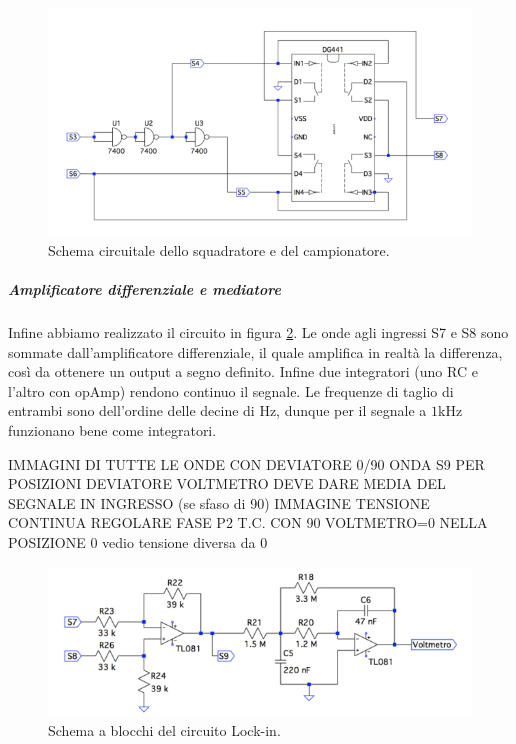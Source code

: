 \documentclass[10pt,a4paper]{article}
\begin{document}
\begin{figure}[!htb]
  \centering
  \includegraphics[scale=0.75]{sqadratore-campionatore.png}
\caption{Schema circuitale dello squadratore e del campionatore.\label{fig:sqadratore-campionatore}}
\end{figure}


\subparagraph{Amplificatore differenziale e mediatore}
Infine abbiamo realizzato il circuito in figura \ref{fig:amplificatorediff-mediatore}. Le onde agli ingressi S7 e S8 sono sommate dall'amplificatore differenziale, il quale amplifica in realtà la differenza, così da ottenere un output a segno definito. Infine due integratori (uno RC e l'altro con opAmp) rendono continuo il segnale. Le frequenze di taglio di entrambi sono dell'ordine delle decine di Hz, dunque per il segnale a $1$kHz funzionano bene come integratori.

IMMAGINI DI TUTTE LE ONDE CON DEVIATORE 0/90
ONDA S9 PER POSIZIONI DEVIATORE%
VOLTMETRO DEVE DARE MEDIA DEL SEGNALE IN INGRESSO (se sfaso di 90)
IMMAGINE TENSIONE CONTINUA
REGOLARE FASE P2 T.C. CON 90 VOLTMETRO=0 %
NELLA POSIZIONE 0 vedio tensione diversa da 0

\begin{figure}[!htb]
  \centering
  \includegraphics[scale=0.75]{amplificatorediff-mediatore.png}
\caption{Schema a blocchi del circuito Lock-in.\label{fig:amplificatorediff-mediatore}}
\end{figure}
\end{document}
